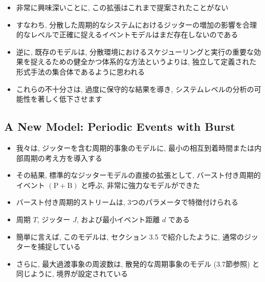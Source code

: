 \begin{frame}{}
    \begin{itemize}
        \item 非常に興味深いことに, この拡張はこれまで提案されたことがない
        \item すなわち, 分散した周期的なシステムにおけるジッターの増加の影響を合理的なレベルで正確に捉えるイベントモデルはまだ存在しないのである
        \item 逆に, 既存のモデルは, 分散環境におけるスケジューリングと実行の重要な効果を捉えるための健全かつ体系的な方法というよりは, 独立して定義された形式手法の集合体であるように思われる
        \item これらの不十分さは, 過度に保守的な結果を導き, システムレベルの分析の可能性を著しく低下させます
    \end{itemize}
\end{frame}


\subsection{A New Model: Periodic Events with Burst}
\label{ssec: a new model: periodic events with burst}

\begin{frame}{}
    \begin{itemize}
        \item 我々は, ジッターを含む周期的事象のモデルに, 最小の相互到着時間または内部周期の考え方を導入する
        \item その結果, 標準的なジッターモデルの直接の拡張として, バースト付き周期的イベント $(\mathrm{P}+\mathrm{B})$ と呼ぶ, 非常に強力なモデルができた
        \item バースト付き周期的ストリームは, 3つのパラメータで特徴付けられる
        \item 周期 $T$, ジッター $J$, および最小イベント距離 $d$ である
        \item 簡単に言えば, このモデルは, セクション 3.5 で紹介したように, 通常のジッターを捕捉している
        \item さらに, 最大過渡事象の周波数は, 散発的な周期事象のモデル (3.7節参照) と同じように, 境界が設定されている
    \end{itemize}
\end{frame}

\begin{frame}{}
\end{frame}

